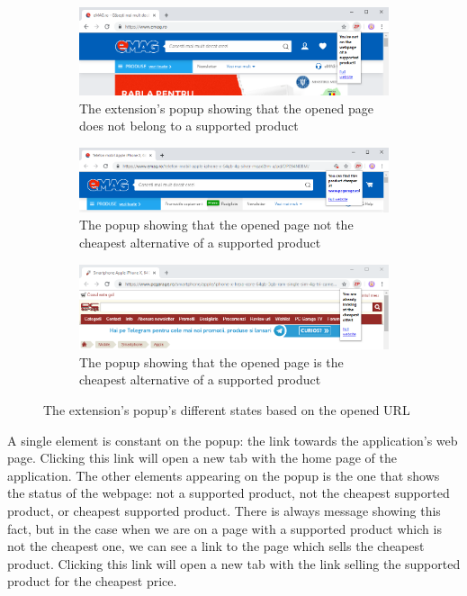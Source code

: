 \documentclass[12pt,a4paper,twoside]{report}
\begin{document}
\begin{figure}[ht]
  \centering
  \begin{subfigure}{\textwidth}
    \centering
    \includegraphics[width=0.8\linewidth]{img/extension_popup_not_supported.png}
    \caption[]{The extension's popup showing that the opened page does not belong to a supported product}
    \label{fig:extension_popup_not_supported}
  \end{subfigure}
  \begin{subfigure}{\textwidth}
    \centering
    \includegraphics[width=0.8\linewidth]{img/extension_popup_cheaper.png}
    \caption[]{The popup showing that the opened page not the cheapest alternative of a supported product}
    \label{fig:extension_popup_cheaper}
  \end{subfigure}
  \begin{subfigure}{\textwidth}
    \centering
    \includegraphics[width=0.8\linewidth]{img/extension_popup_cheapest.png}
    \caption[]{The popup showing that the opened page is the cheapest alternative of a supported product}
    \label{fig:extension_popup_cheapest}
  \end{subfigure}
  \caption{The extension's popup's different states based on the opened URL}
  \label{mfig:extension_popup_states}
\end{figure}

A single element is constant on the popup: the link towards the application's web page. Clicking this link will open a new tab with the home page of the application. The other elements appearing on the popup is the one that shows the status of the webpage: not a supported product, not the cheapest supported product, or cheapest supported product. There is always message showing this fact, but in the case when we are on a page with a supported product which is not the cheapest one, we can see a link to the page which sells the cheapest product. Clicking this link will open a new tab with the link selling the supported product for the cheapest price.
\end{document}
